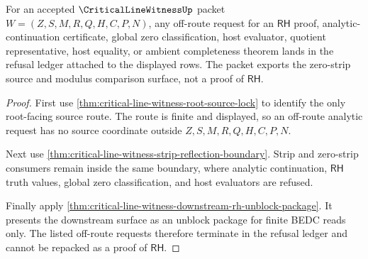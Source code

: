 \begin{theorem}
\label{thm:critical-line-witness-modulus-refusal-ledger-soundness}
For an accepted $\CriticalLineWitnessUp$ packet $W=(Z,S,M,R,Q,H,C,P,N)$, any off-route request for an $\mathsf{RH}$ proof, analytic-continuation certificate, global zero classification, host evaluator, quotient representative, host equality, or ambient completeness theorem lands in the refusal ledger attached to the displayed rows. The packet exports the zero-strip source and modulus comparison surface, not a proof of $\mathsf{RH}$.
\end{theorem}
\begin{proof}
First use \autoref{thm:critical-line-witness-root-source-lock} to identify the only root-facing source route. The route is finite and displayed, so an off-route analytic request has no source coordinate outside $Z,S,M,R,Q,H,C,P,N$.

Next use \autoref{thm:critical-line-witness-strip-reflection-boundary}. Strip and zero-strip consumers remain inside the same boundary, where analytic continuation, $\mathsf{RH}$ truth values, global zero classification, and host evaluators are refused.

Finally apply \autoref{thm:critical-line-witness-downstream-rh-unblock-package}. It presents the downstream surface as an unblock package for finite BEDC reads only. The listed off-route requests therefore terminate in the refusal ledger and cannot be repacked as a proof of $\mathsf{RH}$.
\end{proof}
